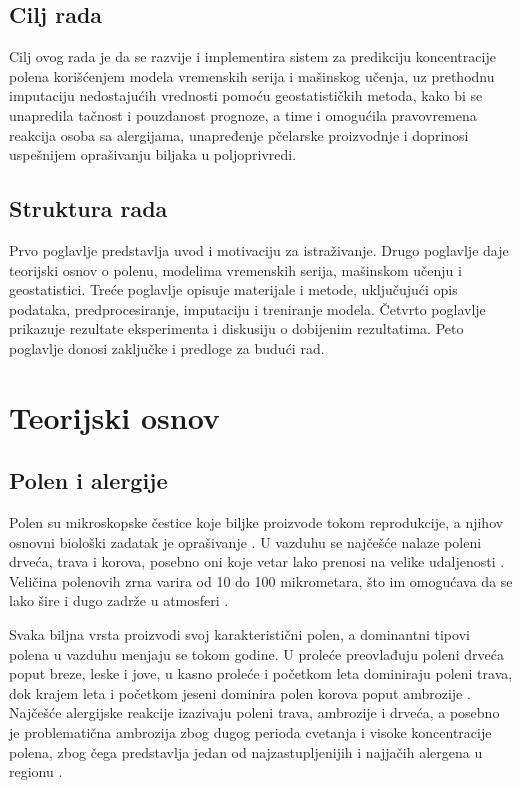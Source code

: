 \documentclass[12pt]{article}
\begin{document}
\subsection{Cilj rada}
Cilj ovog rada je da se razvije i implementira sistem za predikciju koncentracije polena korišćenjem modela vremenskih serija i mašinskog učenja, uz prethodnu imputaciju nedostajućih vrednosti pomoću geostatističkih metoda, kako bi se unapredila tačnost i pouzdanost prognoze, a time i omogućila pravovremena reakcija osoba sa alergijama, unapređenje pčelarske proizvodnje i doprinosi uspešnijem oprašivanju biljaka u poljoprivredi.

\subsection{Struktura rada}
Prvo poglavlje predstavlja uvod i motivaciju za istraživanje. Drugo poglavlje daje teorijski osnov o polenu, modelima vremenskih serija, mašinskom učenju i geostatistici. Treće poglavlje opisuje materijale i metode, uključujući opis podataka, predprocesiranje, imputaciju i treniranje modela. Četvrto poglavlje prikazuje rezultate eksperimenta i diskusiju o dobijenim rezultatima. Peto poglavlje donosi zaključke i predloge za budući rad.
\newpage
\section{Teorijski osnov}

\subsection{Polen i alergije}
Polen su mikroskopske čestice koje biljke proizvode tokom reprodukcije, a njihov osnovni biološki zadatak je oprašivanje \cite{pollenBio2021}. U vazduhu se najčešće nalaze poleni drveća, trava i korova, posebno oni koje vetar lako prenosi na velike udaljenosti \cite{sofia2023}. Veličina polenovih zrna varira od 10 do 100 mikrometara, što im omogućava da se lako šire i dugo zadrže u atmosferi \cite{piotrowska2012}.

Svaka biljna vrsta proizvodi svoj karakteristični polen, a dominantni tipovi polena u vazduhu menjaju se tokom godine. U proleće preovlađuju poleni drveća poput breze, leske i jove, u kasno proleće i početkom leta dominiraju poleni trava, dok krajem leta i početkom jeseni dominira polen korova poput ambrozije \cite{birch2019}. Najčešće alergijske reakcije izazivaju poleni trava, ambrozije i drveća, a posebno je problematična ambrozija zbog dugog perioda cvetanja i visoke koncentracije polena, zbog čega predstavlja jedan od najzastupljenijih i najjačih alergena u regionu \cite{omalizumab2022}.
\end{document}
